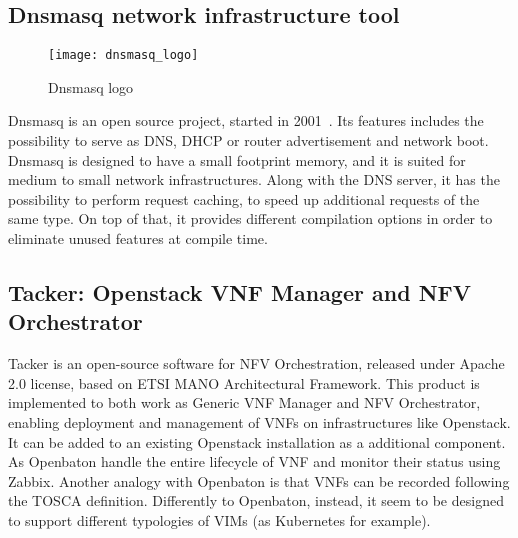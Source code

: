 \subsection{Dnsmasq network infrastructure tool}
\begin{figure}[h]
  \centering \texttt{[image: dnsmasq\_logo]}
  \caption{Dnsmasq logo}
  \label{chap:prjan:img:dnsmasq_logo}
\end{figure}
Dnsmasq is an open source project, started in 2001~\cite{dnsmasqweb}. Its
features includes the possibility to serve as DNS, DHCP or router advertisement
and network boot. Dnsmasq is designed to have a small footprint memory, and it
is suited for medium to small network infrastructures. Along with the DNS
server, it has the possibility to perform request caching, to speed up
additional requests of the same type. On top of that, it provides different
compilation options in order to eliminate unused features at compile time.

\subsection{Tacker: Openstack VNF Manager and NFV Orchestrator}
Tacker is an open-source software for NFV Orchestration, released under Apache
2.0 license, based on ETSI MANO Architectural Framework. This product is
implemented to both work as Generic VNF Manager and NFV Orchestrator, enabling
deployment and management of VNFs on infrastructures like Openstack. It can be
added to an existing Openstack installation as a additional component. As
Openbaton handle the entire lifecycle of VNF and monitor their status using
Zabbix. Another analogy with Openbaton is that VNFs can be recorded following
the TOSCA definition. Differently to Openbaton, instead, it seem to be designed
to support different typologies of VIMs (as Kubernetes for example). 
